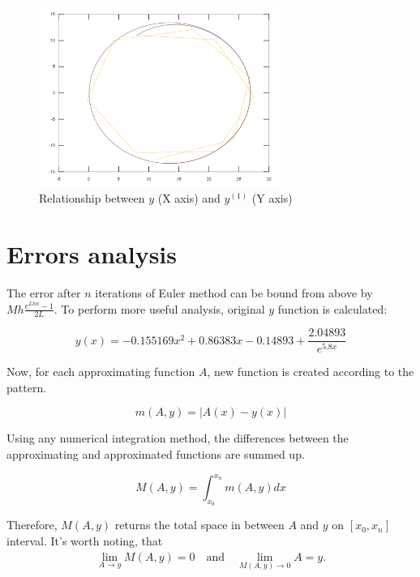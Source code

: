 \documentclass[a4paper,12pt]{article}
\begin{document}
\begin{figure}[H]
    \centering
    \includegraphics[width=0.7\textwidth]{yz.png}
    \caption{Relationship between $y$ (X axis) and $y^{(1)}$ (Y axis)}
    \label{fig:yz}
\end{figure}

\section{Errors analysis}
The error after $n$ iterations of Euler method can be bound from above by $Mh\frac{e^{Lhn} - 1}{2L}$. To perform more useful analysis, original $y$ function is calculated:

\begin{equation}
    y(x) = -0.155169x^2 + 0.86383x - 0.14893 + \frac{2.04893}{e^{5.8x}}
\end{equation}

Now, for each approximating function $A$, new function is created according to the pattern. 

\begin{equation}
    m(A, y) = | A(x) - y(x) |
\end{equation}

Using any numerical integration method, the differences between the approximating and approximated functions are summed up.

\begin{equation}
    M(A, y) = \int_{x_0}^{x_n} m(A, y) dx
\end{equation}

Therefore, $M(A, y)$ returns the total space in between $A$ and $y$ on $[x_0, x_n]$ interval. It's worth noting, that
\begin{gather*}
    \lim_{A \to y} M(A, y) = 0\quad \text{and}\quad \lim_{M(A, y) \to 0} A = y.
\end{gather*}
\end{document}
